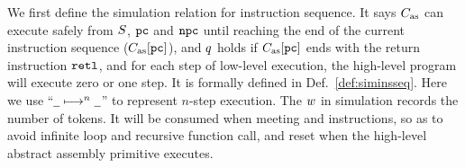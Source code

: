 We first define the simulation relation for
instruction sequence.
It says $C_{\text{as}}$ can execute safely
from $S$, $\texttt{pc}$ and $\texttt{npc}$ until reaching
the end of the current instruction sequence ($C_{\text{as}}[\texttt{pc}]$),
and $q$ holds if $C_{\text{as}}[\texttt{pc}]$ ends with the return
instruction $\texttt{retl}{}$, and for each step of low-level
execution, the high-level program will execute zero or
one step.
It is formally defined in Def.~\ref{def:siminsseq}.
Here we use ``$\underline{\ \,} \longmapsto^{n} \underline{\ \,}$'' to
represent $n$-step execution.
The $w$ in simulation records the number of tokens.
It will be consumed when meeting \jmp{} and \call{}
instructions, so as to avoid infinite loop and recursive
function call, and reset when the high-level
abstract assembly primitive executes.

